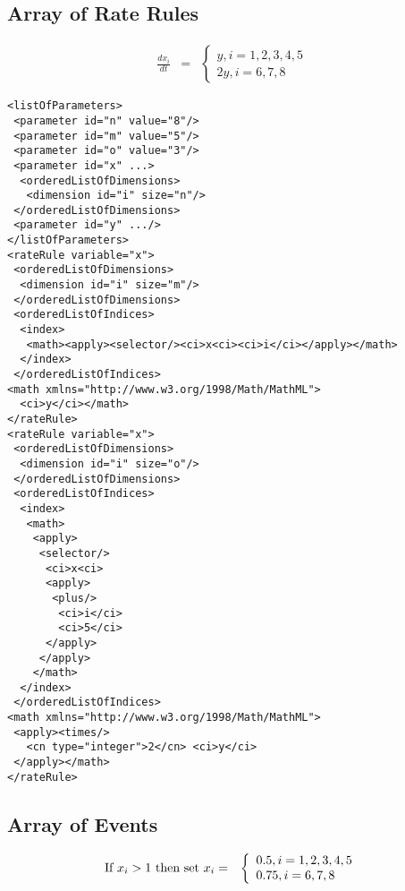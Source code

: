 \subsection{Array of Rate Rules}

\begin{eqnarray*}
\frac{dx_i}{dt} & = & \left\{ \begin{array}{l}
  y, i = 1,2,3,4,5 \\
 2y, i = 6, 7, 8 
\end{array}
\right.
\end{eqnarray*}
\begin{verbatim}
<listOfParameters>
 <parameter id="n" value="8"/>
 <parameter id="m" value="5"/>
 <parameter id="o" value="3"/>
 <parameter id="x" ...> 
  <orderedListOfDimensions>
   <dimension id="i" size="n"/>
 </orderedListOfDimensions>
 <parameter id="y" .../>
</listOfParameters>
<rateRule variable="x">
 <orderedListOfDimensions>
  <dimension id="i" size="m"/>
 </orderedListOfDimensions>
 <orderedListOfIndices>
  <index>
   <math><apply><selector/><ci>x<ci><ci>i</ci></apply></math>
  </index>
 </orderedListOfIndices>
<math xmlns="http://www.w3.org/1998/Math/MathML">
  <ci>y</ci></math>
</rateRule>
<rateRule variable="x">
 <orderedListOfDimensions>
  <dimension id="i" size="o"/>
 </orderedListOfDimensions>
 <orderedListOfIndices>
  <index>
   <math>
    <apply>
     <selector/>
      <ci>x<ci>
      <apply>
       <plus/>
        <ci>i</ci>
        <ci>5</ci>
      </apply>
     </apply>
    </math>
  </index>
 </orderedListOfIndices>
<math xmlns="http://www.w3.org/1998/Math/MathML">
 <apply><times/>
   <cn type="integer">2</cn> <ci>y</ci>
 </apply></math> 
</rateRule>
\end{verbatim}

\subsection{Array of Events}

\begin{eqnarray*}
\textup{If }x_i > 1\textup{ then set }x_i & = & \left\{ \begin{array}{l}
0.5, i = 1,2,3,4,5 \\
0.75, i = 6,7,8
\end{array}
\right.
\end{eqnarray*}

